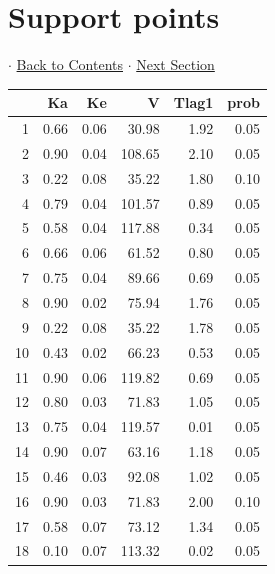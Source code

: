 \documentclass{article}
\begin{document}
          \section{Support points} 
 $\cdot$ \hyperlink{tableofcontents}{Back to Contents} $\cdot$ \hyperlink{ppe}{Next Section} \newline
          \newline 
\begin{tabular}{rrrrrr}
  \hline
 & Ka & Ke & V & Tlag1 & prob \\ 
  \hline
1 & 0.66 & 0.06 & 30.98 & 1.92 & 0.05 \\ 
  2 & 0.90 & 0.04 & 108.65 & 2.10 & 0.05 \\ 
  3 & 0.22 & 0.08 & 35.22 & 1.80 & 0.10 \\ 
  4 & 0.79 & 0.04 & 101.57 & 0.89 & 0.05 \\ 
  5 & 0.58 & 0.04 & 117.88 & 0.34 & 0.05 \\ 
  6 & 0.66 & 0.06 & 61.52 & 0.80 & 0.05 \\ 
  7 & 0.75 & 0.04 & 89.66 & 0.69 & 0.05 \\ 
  8 & 0.90 & 0.02 & 75.94 & 1.76 & 0.05 \\ 
  9 & 0.22 & 0.08 & 35.22 & 1.78 & 0.05 \\ 
  10 & 0.43 & 0.02 & 66.23 & 0.53 & 0.05 \\ 
  11 & 0.90 & 0.06 & 119.82 & 0.69 & 0.05 \\ 
  12 & 0.80 & 0.03 & 71.83 & 1.05 & 0.05 \\ 
  13 & 0.75 & 0.04 & 119.57 & 0.01 & 0.05 \\ 
  14 & 0.90 & 0.07 & 63.16 & 1.18 & 0.05 \\ 
  15 & 0.46 & 0.03 & 92.08 & 1.02 & 0.05 \\ 
  16 & 0.90 & 0.03 & 71.83 & 2.00 & 0.10 \\ 
  17 & 0.58 & 0.07 & 73.12 & 1.34 & 0.05 \\ 
  18 & 0.10 & 0.07 & 113.32 & 0.02 & 0.05 \\ 
   \hline
\end{tabular}
              
          \hypertarget{ppe}{}
          
\end{document}
